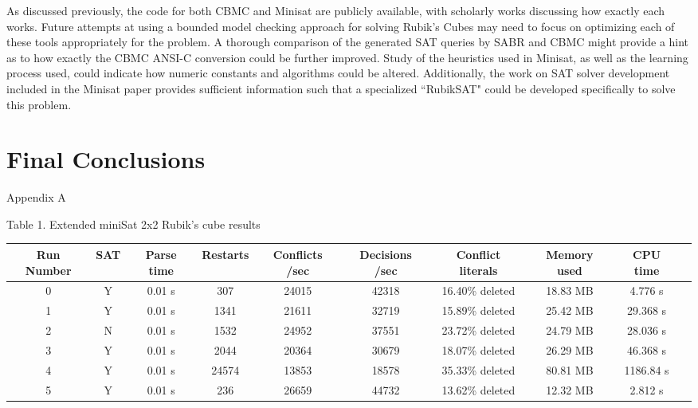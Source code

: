\documentclass{article}
\begin{document}
\noindent As discussed previously, the code for both CBMC and Minisat are publicly available, with scholarly works discussing how exactly each works. Future attempts at using a bounded model checking approach for solving Rubik's Cubes may need to focus on optimizing each of these tools appropriately for the problem. A thorough comparison of the generated SAT queries by SABR and CBMC might provide a hint as to how exactly the CBMC ANSI-C conversion could be further improved. Study of the heuristics used in Minisat, as well as the learning process used, could indicate how numeric constants and algorithms could be altered. Additionally, the work on SAT solver development included in the Minisat paper provides 
sufficient information such that a specialized ``RubikSAT" could be developed specifically to solve this problem.


\newpage

\section{Final Conclusions}


\pagebreak
\begin{center}
Appendix A
\end{center}

\begin{center}
Table 1. Extended miniSat 2x2 Rubik's cube results \\[1mm]
\end{center}
\begin{adjustwidth}{-3.5cm}{}
\begin{tabular}{|c|c|c|c|c|c|c|c|c|c|}
\hline
Run Number & SAT & Parse time & Restarts & Conflicts /sec & Decisions /sec & Conflict literals & Memory used & CPU time \\
\hline
0 & Y & 0.01 s & 307 & 24015 & 42318 & 16.40\% deleted & 18.83 MB & 4.776 s \\
\hline
1 & Y & 0.01 s & 1341 & 21611 & 32719 & 15.89\% deleted & 25.42 MB & 29.368 s \\
\hline
2 & N & 0.01 s & 1532 & 24952 & 37551 & 23.72\% deleted & 24.79 MB & 28.036 s \\
\hline
3 & Y & 0.01 s & 2044 & 20364 & 30679 & 18.07\% deleted &  26.29 MB & 46.368 s \\
\hline
4 & Y & 0.01 s & 24574 & 13853 & 18578 & 35.33\% deleted & 80.81 MB & 1186.84 s \\
\hline
5 & Y & 0.01 s & 236 & 26659 & 44732 & 13.62\% deleted & 12.32 MB & 2.812 s \\
\hline
\end{tabular} \\[3mm]
\end{adjustwidth}
\end{document}
